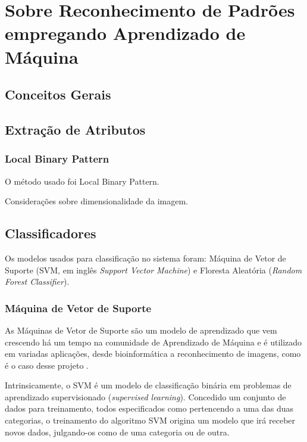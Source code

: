 \chapter{Sobre Reconhecimento de Padrões empregando Aprendizado de Máquina}

\section{Conceitos Gerais}

\section{Extração de Atributos}

\subsection{Local Binary Pattern}



O método usado foi Local Binary Pattern.

Considerações sobre dimensionalidade da imagem.



\section{Classificadores}

Os modelos usados para classificação no sistema foram: Máquina de Vetor de Suporte (SVM, em inglês \textit{Support Vector Machine}) e Floresta Aleatória (\textit{Random Forest Classifier}).

\subsection{Máquina de Vetor de Suporte}

As Máquinas de Vetor de Suporte são um modelo de aprendizado que vem crescendo há um tempo na comunidade de Aprendizado de Máquina e é utilizado em variadas aplicações, desde bioinformática a reconhecimento de imagens, como é o caso desse projeto   .

Intrinsicamente, o SVM é um modelo de classificação binária em problemas de aprendizado supervisionado (\textit{supervised learning}). Concedido um conjunto de dados para treinamento, todos especificados como pertencendo a uma das duas categorias, o treinamento do algoritmo SVM origina um modelo que irá receber novos dados, julgando-os como de uma categoria ou de outra.

